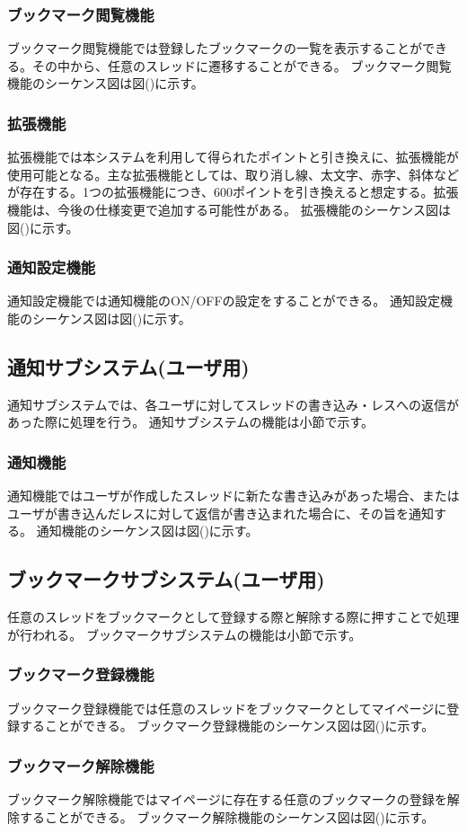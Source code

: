 \documentclass[a4j]{jarticle}
\begin{document}
  \subsubsection{ブックマーク閲覧機能}
  ブックマーク閲覧機能では登録したブックマークの一覧を表示することができる。その中から、任意のスレッドに遷移することができる。
  ブックマーク閲覧機能のシーケンス図は図()に示す。
  \subsubsection{拡張機能}
  拡張機能では本システムを利用して得られたポイントと引き換えに、拡張機能が使用可能となる。主な拡張機能としては、取り消し線、太文字、赤字、斜体などが存在する。1つの拡張機能につき、600ポイントを引き換えると想定する。拡張機能は、今後の仕様変更で追加する可能性がある。
  拡張機能のシーケンス図は図()に示す。
  \subsubsection{通知設定機能}
  通知設定機能では通知機能のON/OFFの設定をすることができる。
  通知設定機能のシーケンス図は図()に示す。
  \subsection{通知サブシステム(ユーザ用)}
  通知サブシステムでは、各ユーザに対してスレッドの書き込み・レスへの返信があった際に処理を行う。
  通知サブシステムの機能は小節で示す。
  \subsubsection{通知機能}
  通知機能ではユーザが作成したスレッドに新たな書き込みがあった場合、またはユーザが書き込んだレスに対して返信が書き込まれた場合に、その旨を通知する。
  通知機能のシーケンス図は図()に示す。
  \subsection{ブックマークサブシステム(ユーザ用)}
  任意のスレッドをブックマークとして登録する際と解除する際に押すことで処理が行われる。
  ブックマークサブシステムの機能は小節で示す。
  \subsubsection{ブックマーク登録機能}
  ブックマーク登録機能では任意のスレッドをブックマークとしてマイページに登録することができる。
  ブックマーク登録機能のシーケンス図は図()に示す。
  \subsubsection{ブックマーク解除機能}
  ブックマーク解除機能ではマイページに存在する任意のブックマークの登録を解除することができる。
  ブックマーク解除機能のシーケンス図は図()に示す。
\end{document}
